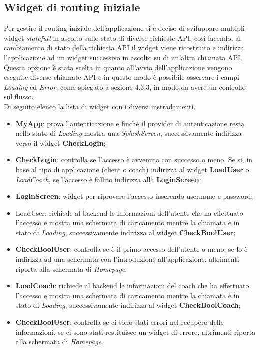 \subsection{Widget di routing iniziale}
Per gestire il routing iniziale dell'applicazione si è deciso di sviluppare multipli widget \textit{statefull} in ascolto sullo stato di diverse richieste API, così facendo, al cambiamento di stato della richiesta API il widget viene ricostruito e indirizza l'applicazione ad un widget successivo in ascolto su di un'altra chiamata API. Questa opzione è stata scelta in quanto all'avvio dell'applicazione vengono eseguite diverse chiamate API e in questo modo è possibile osservare i campi \textit{Loading} ed \textit{Error}, come spiegato a sezione 4.3.3, in modo da avere un controllo sul flusso.\\
Di seguito elenco la lista di widget con i diversi instradamenti.\\
\begin{itemize}
    \item \textbf{MyApp}: prova l'autenticazione e finché il provider di autenticazione resta nello stato di \textit{Loading} mostra una \textit{SplashScreen}, successivamente indirizza verso il widget \textbf{CheckLogin};
    \item \textbf{CheckLogin}: controlla se l'accesso è avvenuto con successo o meno. Se si, in base al tipo di applicazione (client o coach) indirizza al widget \textbf{LoadUser} o \textit{LoadCoach}, se l'accesso è fallito indirizza alla \textbf{LoginScreen};
    \item \textbf{LoginScreen}: widget per riprovare l'accesso inserendo username e password;
    \item LoadUser: richiede al backend le informazioni dell'utente che ha effettuato l'accesso e mostra una schermata di caricamento mentre la chiamata è in stato di \textit{Loading}, successivamente indirizza al widget \textbf{CheckBoolUser};
    \item \textbf{CheckBoolUser}: controlla se è il primo accesso dell'utente o meno, se lo è indirizza ad una schermata con l'introduzione all'applicazione, altrimenti riporta alla schermata di \textit{Homepage}.
    \item \textbf{LoadCoach}: richiede al backend le informazioni del coach che ha effettuato l'accesso e mostra una schermata di caricamento mentre la chiamata è in stato di \textit{Loading}, successivamente indirizza al widget \textbf{CheckBoolCoach};
    \item \textbf{CheckBoolUser}: controlla se ci sono stati errori nel recupero delle informazioni, se ci sono stati restituisce un widget di errore, altrimenti riporta alla schermata di \textit{Homepage}.
\end{itemize}

